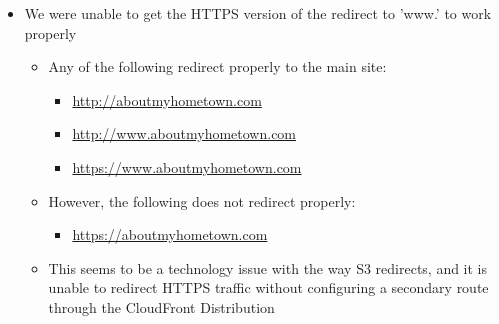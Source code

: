 \documentclass[12pt]{article}
\begin{document}
\begin{itemize}
    \item We were unable to get the HTTPS version of the redirect to 'www.' to work properly
          \begin{itemize}
              \item Any of the following redirect properly to the main site:
                    \begin{itemize}
                        \item \url{http://aboutmyhometown.com}
                        \item \url{http://www.aboutmyhometown.com}
                        \item \url{https://www.aboutmyhometown.com}
                    \end{itemize}
              \item However, the following does not redirect properly:
                    \begin{itemize}
                        \item \url{https://aboutmyhometown.com}
                    \end{itemize}
              \item This seems to be a technology issue with the way S3 redirects, and it is unable to redirect HTTPS traffic without configuring a secondary route through the CloudFront Distribution
          \end{itemize}
\end{itemize}
\end{document}
